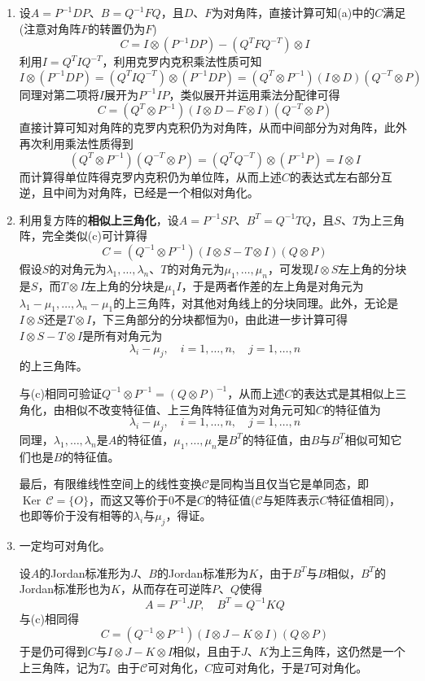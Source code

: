 \documentclass[a4paper,UTF8,fontset=windows,AutoFakeBold]{ctexart}
\DeclareMathOperator{\Ker}{Ker\,}
\newcommand*{\mc}{\mathcal{C}}
\begin{document}
\begin{enumerate}
\begin{enumerate}
        \item
        设$A=P^{-1}DP$、$B=Q^{-1}FQ$，且$D$、$F$为对角阵，直接计算可知(a)中的$C$满足(注意对角阵$F$的转置仍为$F$)
        $$C=I\otimes(P^{-1}DP)-(Q^TFQ^{-T})\otimes I$$
        利用$I=Q^TIQ^{-T}$，利用克罗内克积乘法性质可知
        $$I\otimes(P^{-1}DP)=(Q^TIQ^{-T})\otimes(P^{-1}DP)=(Q^T\otimes P^{-1})(I\otimes D)(Q^{-T}\otimes P)$$
        同理对第二项将$I$展开为$P^{-1}IP$，类似展开并运用乘法分配律可得
        $$C=(Q^T\otimes P^{-1})(I\otimes D-F\otimes I)(Q^{-T}\otimes P)$$
        直接计算可知对角阵的克罗内克积仍为对角阵，从而中间部分为对角阵，此外再次利用乘法性质得到
        $$(Q^T\otimes P^{-1})(Q^{-T}\otimes P)=(Q^TQ^{-T})\otimes(P^{-1}P)=I\otimes I$$
        而计算得单位阵得克罗内克积仍为单位阵，从而上述$C$的表达式左右部分互逆，且中间为对角阵，已经是一个相似对角化。

        \item
        利用复方阵的\textbf{相似上三角化}，设$A=P^{-1}SP$、$B^T=Q^{-1}TQ$，且$S$、$T$为上三角阵，完全类似(c)可计算得
        $$C=(Q^{-1}\otimes P^{-1})(I\otimes S-T\otimes I)(Q\otimes P)$$
        假设$S$的对角元为$\lambda_1,\dots,\lambda_n$、$T$的对角元为$\mu_1,\dots,\mu_n$，可发现$I\otimes S$左上角的分块是$S$，而$T\otimes I$左上角的分块是$\mu_1I$，于是两者作差的左上角是对角元为$\lambda_1-\mu_1,\dots,\lambda_n-\mu_1$的上三角阵，对其他对角线上的分块同理。此外，无论是$I\otimes S$还是$T\otimes I$，下三角部分的分块都恒为0，由此进一步计算可得$I\otimes S-T\otimes I$是所有对角元为
        $$\lambda_i-\mu_j,\quad i=1,\dots,n,\quad j=1,\dots,n$$
        的上三角阵。

        与(c)相同可验证$Q^{-1}\otimes P^{-1}=(Q\otimes P)^{-1}$，从而上述$C$的表达式是其相似上三角化，由相似不改变特征值、上三角阵特征值为对角元可知$C$的特征值为
        $$\lambda_i-\mu_j,\quad i=1,\dots,n,\quad j=1,\dots,n$$
        同理，$\lambda_1,\dots,\lambda_n$是$A$的特征值，$\mu_1,\dots,\mu_n$是$B^T$的特征值，由$B$与$B^T$相似可知它们也是$B$的特征值。

        最后，有限维线性空间上的线性变换$\mc$是同构当且仅当它是单同态，即$\Ker\mc=\{O\}$，而这又等价于0不是$C$的特征值($\mc$与矩阵表示$C$特征值相同)，也即等价于没有相等的$\lambda_i$与$\mu_j$，得证。

        \item 一定均可对角化。
        
        设$A$的Jordan标准形为$J$、$B$的Jordan标准形为$K$，由于$B^T$与$B$相似，$B^T$的Jordan标准形也为$K$，从而存在可逆阵$P$、$Q$使得
        $$A=P^{-1}JP,\quad B^T=Q^{-1}KQ$$
        与(c)相同得
        $$C=(Q^{-1}\otimes P^{-1})(I\otimes J-K\otimes I)(Q\otimes P)$$
        于是仍可得到$C$与$I\otimes J-K\otimes I$相似，且由于$J$、$K$为上三角阵，这仍然是一个上三角阵，记为$T$。由于$\mc$可对角化，$C$应可对角化，于是$T$可对角化。


\end{enumerate}
\end{enumerate}
\end{document}
